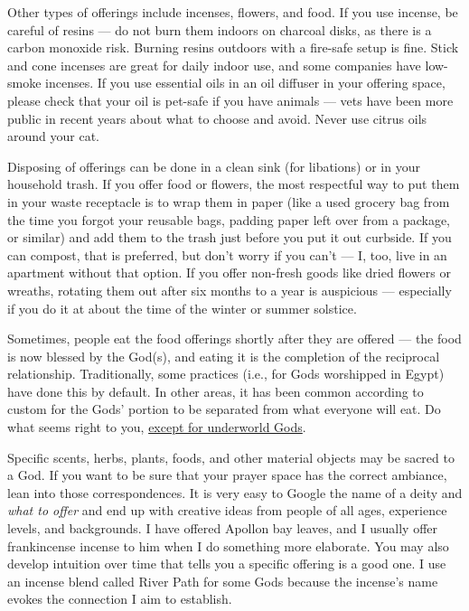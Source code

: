 \documentclass[
]{book}
\begin{document}
Other types of offerings include incenses, flowers, and food. If you use incense, be careful of resins --- do not burn them indoors on charcoal disks, as there is a carbon monoxide risk. Burning resins outdoors with a fire-safe setup is fine. Stick and cone incenses are great for daily indoor use, and some companies have low-smoke incenses. If you use essential oils in an oil diffuser in your offering space, please check that your oil is pet-safe if you have animals --- vets have been more public in recent years about what to choose and avoid. Never use citrus oils around your cat.

Disposing of offerings can be done in a clean sink (for libations) or in your household trash. If you offer food or flowers, the most respectful way to put them in your waste receptacle is to wrap them in paper (like a used grocery bag from the time you forgot your reusable bags, padding paper left over from a package, or similar) and add them to the trash just before you put it out curbside. If you can compost, that is preferred, but don't worry if you can't --- I, too, live in an apartment without that option. If you offer non-fresh goods like dried flowers or wreaths, rotating them out after six months to a year is auspicious --- especially if you do it at about the time of the winter or summer solstice.

Sometimes, people eat the food offerings shortly after they are offered --- the food is now blessed by the God(s), and eating it is the completion of the reciprocal relationship. Traditionally, some practices (i.e., for Gods worshipped in Egypt) have done this by default. In other areas, it has been common according to custom for the Gods' portion to be separated from what everyone will eat. Do what seems right to you, \protect\hyperlink{underworld}{except for underworld Gods}.

Specific scents, herbs, plants, foods, and other material objects may be sacred to a God. If you want to be sure that your prayer space has the correct ambiance, lean into those correspondences. It is very easy to Google the name of a deity and \emph{what to offer} and end up with creative ideas from people of all ages, experience levels, and backgrounds. I have offered Apollon bay leaves, and I usually offer frankincense incense to him when I do something more elaborate. You may also develop intuition over time that tells you a specific offering is a good one. I use an incense blend called River Path for some Gods because the incense's name evokes the connection I aim to establish.
\end{document}
